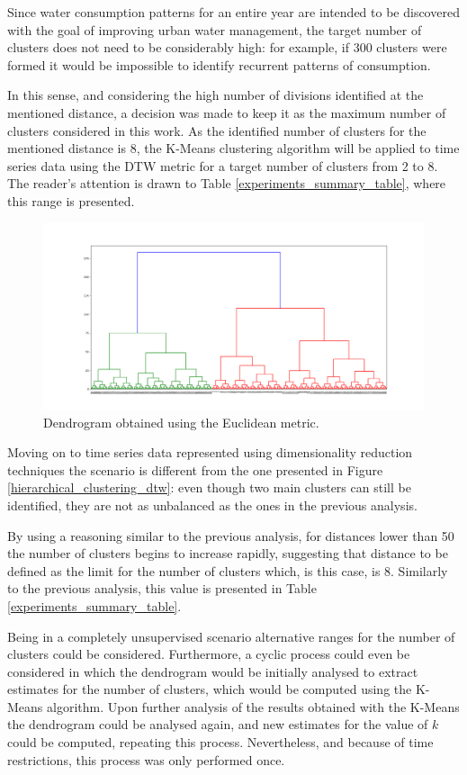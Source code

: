 \documentclass[9pt,journal,compsoc]{IEEEtran}
\begin{document}
Since water consumption patterns for an entire year are intended to be discovered with the goal of improving urban water management, the target number of clusters does not need to be considerably high: for example, if 300 clusters were formed it would be impossible to identify recurrent patterns of consumption.

In this sense, and considering the high number of divisions identified at the mentioned distance, a decision was made to keep it as the maximum number of clusters considered in this work. As the identified number of clusters for the mentioned distance is 8, the K-Means clustering algorithm will be applied to time series data using the DTW metric for a target number of clusters from 2 to 8. The reader's attention is drawn to Table \ref{experiments_summary_table}, where this range is presented.

\begin{figure}[ht]
	\centering
	\includegraphics[scale=0.18]{images/Hierarchical_Clustering_Euclidean.png}
	\caption{Dendrogram obtained using the Euclidean metric.}
	\label{hierarchical_clustering_euclidean}
\end{figure}

Moving on to time series data represented using dimensionality reduction techniques the scenario is different from the one presented in Figure \ref{hierarchical_clustering_dtw}: even though two main clusters can still be identified, they are not as unbalanced as the ones in the previous analysis.

By using a reasoning similar to the previous analysis, for distances lower than 50 the number of clusters begins to increase rapidly, suggesting that distance to be defined as the limit for the number of clusters which, is this case, is 8. Similarly to the previous analysis, this value is presented in Table \ref{experiments_summary_table}.

Being in a completely unsupervised scenario alternative ranges for the number of clusters could be considered. Furthermore, a cyclic process could even be considered in which the dendrogram would be initially analysed to extract estimates for  the number of clusters, which would be computed using the K-Means algorithm. Upon further analysis of the results obtained with the K-Means the dendrogram could be analysed again, and new estimates for the value of $k$ could be computed, repeating this process. Nevertheless, and because of time restrictions, this process was only performed once.
\end{document}
